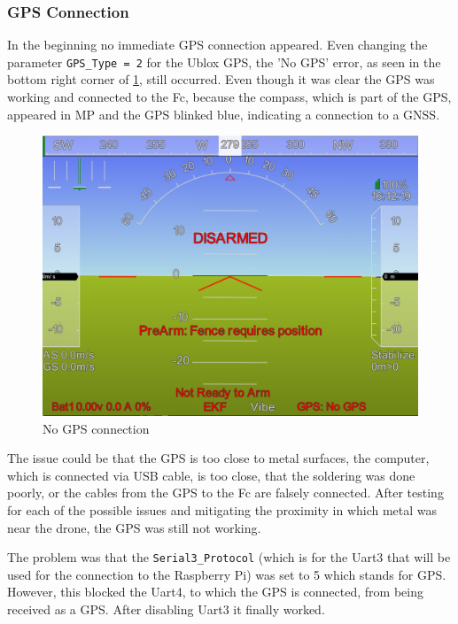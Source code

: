 \documentclass[svgnames]{article}
\begin{document}
	\subsubsection{GPS Connection}
	In the beginning no immediate \gls{GPS} connection appeared. Even changing the parameter \lstinline|GPS_Type = 2| for the Ublox \gls{GPS}, the 'No \gls{GPS}' error, as seen in the bottom right corner of \cref{fig:nogps}, still occurred. Even though it was clear the \gls{GPS} was working and connected to the \gls{Fc}, because the compass, which is part of the \gls{GPS}, appeared in \gls{MP} and the \gls{GPS} blinked blue, indicating a connection to a \gls{GNSS}.
\begin{figure}[ht]
	\centering
	\includegraphics[scale=0.2]{pictures/No_GPS}
	\caption{No \gls{GPS} connection}
	\label{fig:nogps}
\end{figure}

	The issue could be that the \gls{GPS} is too close to metal surfaces, the computer, which is connected via USB cable, is too close, that the soldering was done poorly, or the cables from the \gls{GPS} to the \gls{Fc} are falsely connected. After testing for each of the possible issues and mitigating the proximity in which metal was near the drone, the \gls{GPS} was still not working.

	The problem was that the \lstinline|Serial3_Protocol| (which is for the Uart3 that will be used for the connection to the Raspberry Pi) was set to 5 which stands for \gls{GPS}. However, this blocked the Uart4, to which the \gls{GPS} is connected, from being received as a \gls{GPS}. After disabling Uart3 it finally worked.
\end{document}
